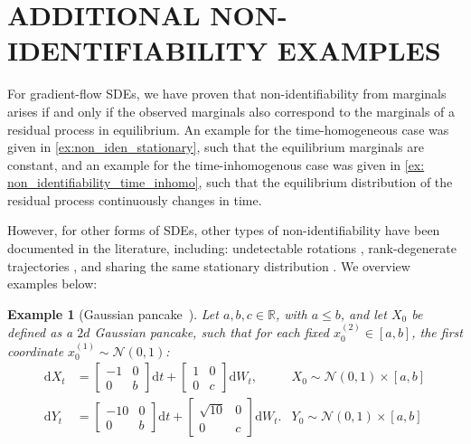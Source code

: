 \documentclass[twoside]{article}
\newcommand{\R} {\mathbb R}
\newtheorem{ex}[theorem]{Example}
\begin{document}
\section{ADDITIONAL NON-IDENTIFIABILITY EXAMPLES}
\label{sec: non_iden_examples}

For gradient-flow SDEs, we have proven that non-identifiability from marginals arises if and only if the observed marginals also correspond to the marginals of a residual process in equilibrium. An example for the time-homogeneous case was given in \cref{ex:non_iden_stationary}, such that the equilibrium marginals are constant, and an example for the time-inhomogenous case was given in \cref{ex: non_identifiability_time_inhomo}, such that the equilibrium distribution of the residual process continuously changes in time. 

However, for other forms of SDEs, other types of non-identifiability have been documented in the literature, including: undetectable rotations \citep{weinreb2018fundamental, shen2025multi, guan2024identifying}, rank-degenerate trajectories \citep{wang2024generator}, and sharing the same stationary distribution \citep{lavenant2021towards}. We overview examples below:
\begin{ex}[Gaussian pancake~]
Let $a,b,c \in \R$, with $a \leq b$, and let $X_0$ be defined as a $2d$ Gaussian pancake, such that for each fixed $x_0^{(2)} \in [a,b]$, the first coordinate $x_0^{(1)} \sim \mathcal{N}(0, 1)$:
\label{ex: non_identifiability_gaussian_pancakes}
\begin{align}
    \mathrm{d}X_t &= \begin{bmatrix} -1 & 0 \\ 0 & b  \end{bmatrix}\mathrm{d}t + \begin{bmatrix} 1 & 0 \\ 0 & c  \end{bmatrix} \mathrm{d}W_t, &X _0 \sim \mathcal{N}(0, 1) \times [a, b] \\
    \mathrm{d}Y_t &= \begin{bmatrix} -10 & 0 \\ 0 & b  \end{bmatrix}\mathrm{d}t + \begin{bmatrix} \sqrt{10} & 0 \\ 0 & c  \end{bmatrix} \mathrm{d}W_t. &Y _0 \sim \mathcal{N}(0, 1) \times [a, b]
\end{align}
\end{ex}
\end{document}

